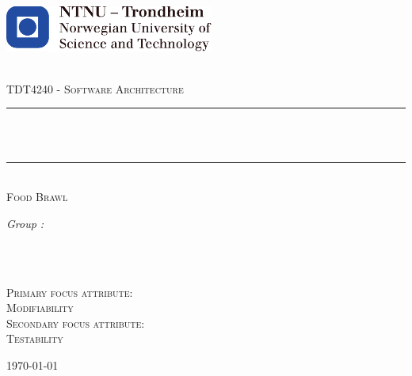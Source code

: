 \begin{titlepage}
\includegraphics[height=1.5cm]{images/ntnu_logo.pdf}\\[1cm]   
\begin{center}

 
~\\[1.5cm]

\textsc{\Large TDT4240 - Software Architecture}\\[0.5cm]

\hrule ~\\[0.2cm]
{\huge \bfseries \mytitle}\\[0.4cm]		%
\hrule ~\\[1.5cm]

\textsc{\Large Food Brawl}\\[0.5cm]

\begin{minipage}{0.7\textwidth}
    \centering
	\large
		\emph{Group \mygroupnumber:}\\~\\
		\myauthor
\end{minipage}\\[0.5cm]



\begin{minipage}{0.4\textwidth}
    \centering
    \textsc{Primary focus attribute:\\Modifiability}\\[0.5cm]
    \textsc{Secondary focus attribute:\\Testability}\\[0.5cm]

\end{minipage}
\vfill
{\large \today}

\end{center}
\end{titlepage}